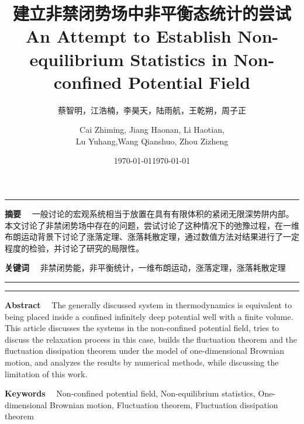\documentclass[a4paper,12pt]{ctexart}
\title{建立非禁闭势场中非平衡态统计的尝试}
\author{蔡智明，江浩楠，李昊天，陆雨航，王乾朔，周子正}
\date{\today}
\begin{document}
    \maketitle
    \noindent\rule{\textwidth}{0.5pt}

    {\heiti \noindent \textbf{摘要}\ \ } 
    {\kaishu 一般讨论的宏观系统相当于放置在具有有限体积的紧闭无限深势阱内部。本文讨论了非禁闭势场中存在的问题，尝试讨论了这种情况下的弛豫过程，在一维布朗运动背景下讨论了涨落定理、涨落耗散定理，通过数值方法对结果进行了一定程度的检验，并讨论了研究的局限性。}

    {\heiti \noindent \textbf{关键词}\ \ } {\kaishu \small 非禁闭势能，非平衡统计，一维布朗运动，涨落定理，涨落耗散定理}

    \noindent\rule{\textwidth}{0.5pt}



 
     
    
    
    
    
    
    
    
    
    

    \newpage

    \title{An Attempt to Establish Non-equilibrium Statistics in Non-confined Potential Field}
    \author{Cai Zhiming, Jiang Haonan, Li Haotian, \\Lu Yuhang,Wang Qianshuo, Zhou Zizheng}
    \date{\today}

    \maketitle

    \noindent\rule{\textwidth}{0.5pt}

    {\heiti \noindent \textbf{Abstract}\ \ } 
    {\kaishu The generally discussed system in thermodynamics is equivalent to being placed inside a confined infinitely deep potential well with a finite volume. This article discusses the systems in the non-confined potential field, tries to discuss the relaxation process in this case, builds the fluctuation theorem and the fluctuation dissipation theorem under the model of one-dimensional Brownian motion, and analyzes the results by numerical methods, while discussing the limitation of this work.}

    {\heiti \noindent \textbf{Keywords}\ \ } {\kaishu 
    Non-confined potential field, Non-equilibrium statistics, One-dimensional Brownian motion, Fluctuation theorem, Fluctuation dissipation theorem
    }
\end{document}
